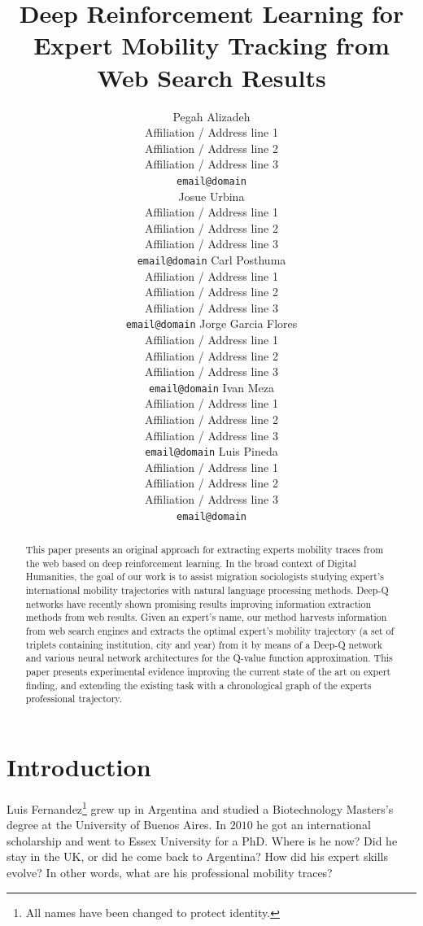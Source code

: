 \documentclass[11pt,a4paper]{article}
\title{Deep Reinforcement Learning for Expert Mobility Tracking from Web Search Results}
\author{Pegah Alizadeh \\
  Affiliation / Address line 1 \\
  Affiliation / Address line 2 \\
  Affiliation / Address line 3 \\
  {\tt email@domain} \\\And
  Josue Urbina \\
  Affiliation / Address line 1 \\
  Affiliation / Address line 2 \\
  Affiliation / Address line 3 \\
  {\tt email@domain}
  Carl Posthuma \\
  Affiliation / Address line 1 \\
  Affiliation / Address line 2 \\
  Affiliation / Address line 3 \\
  {\tt email@domain} 
  Jorge Garcia Flores \\
  Affiliation / Address line 1 \\
  Affiliation / Address line 2 \\
  Affiliation / Address line 3 \\
  {\tt email@domain} 
  Ivan Meza \\
  Affiliation / Address line 1 \\
  Affiliation / Address line 2 \\
  Affiliation / Address line 3 \\
  {\tt email@domain} 
  Luis Pineda \\
  Affiliation / Address line 1 \\
  Affiliation / Address line 2 \\
  Affiliation / Address line 3 \\
  {\tt email@domain}
  \\}
\date{}
\begin{document}
\maketitle
\begin{abstract}

  This paper presents an original approach for extracting experts mobility traces from the web based on deep reinforcement learning. In the broad context of Digital Humanities, the goal of our work is to assist migration sociologists studying expert's international mobility trajectories with natural language processing methods. Deep-Q networks have recently shown promising results improving information extraction methods from web results. Given an expert's name, our method harvests information from web search engines and extracts the optimal expert's mobility trajectory (a set of triplets containing institution, city and year) from it by means of a Deep-Q network and various neural network architectures for the Q-value function approximation. This paper presents experimental evidence improving the current state of the art on expert finding, and extending the existing task with a chronological graph of the experts professional trajectory. 

\end{abstract}
 
\section{Introduction}
Luis Fernandez\footnote{All names have been changed to protect identity.} grew up in Argentina and studied a Biotechnology Masters's degree at the University of Buenos Aires. In $2010$ he got an international scholarship and went to Essex University for a PhD. Where is he now? Did he stay in the UK, or did he come back to Argentina? How did his expert skills evolve? In other words, what are his professional mobility traces?
\end{document}

